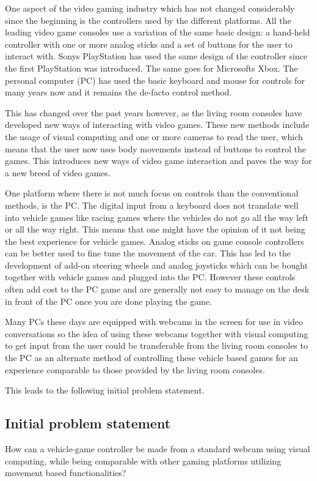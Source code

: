 One aspect of the video gaming industry which has not changed considerably since the beginning is the controllers used by the different platforms. All the leading video game consoles use a variation of the same basic design: a hand-held controller with one or more analog sticks and a set of buttons for the user to interact with. Sonys PlayStation has used the same design of the controller since the first PlayStation was introduced. The same goes for Microsofts Xbox. The personal computer (PC) has used the basic keyboard and mouse for controls for many years now and it remains the de-facto control method.
\bigskip

This has changed over the past years however, as the living room consoles have developed new ways of interacting with video games. These new methods include the usage of visual computing and one or more cameras to read the user, which means that the user now uses body movements instead of buttons to control the games. This introduces new ways of video game interaction and paves the way for a new breed of video games.
\bigskip

One platform where there is not much focus on controls than the conventional methods, is the PC. The digital input from a keyboard does not translate well into vehicle games like racing games where the vehicles do not go all the way left or all the way right. This means that one might have the opinion of it not being the best experience for vehicle games. Analog sticks on game console controllers can be better used to fine tune the movement of the car. This has led to the development of add-on steering wheels and analog joysticks which can be bought together with vehicle games and plugged into the PC. However these controls often add cost to the PC game and are generally not easy to manage on the desk in front of the PC once you are done playing the game.
\bigskip

Many PCs these days are equipped with webcams in the screen for use in video conversations so the idea of using these webcams together with visual computing to get input from the user could be transferable from the living room consoles to the PC as an alternate method of controlling these vehicle based games for an experience comparable to those provided by the living room consoles.

\noindent This leads to the following initial problem statement.

\subsection{Initial problem statement}
How can a vehicle-game controller be made from a standard webcam using visual computing, while being comparable with other gaming platforms utilizing movement based functionalities?